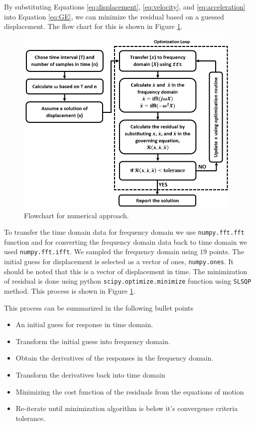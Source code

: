 \documentclass[12pt, a4paper]{extarticle}
\begin{document}
By substituting Equations \eqref{eq:displacement}, \eqref{eq:velocity}, and \eqref{eq:acceleration} into Equation \eqref{eq:GE}, we can minimize the residual based on a guessed displacement. The flow chart for this is shown in Figure \ref{fig:flowchart}.

\begin{figure}[h]
	\centering
	\includegraphics[height=9.00cm]{figure/minimize_residual.png}
	\caption{Flowchart for numerical approach.}
	\label{fig:flowchart}
\end{figure}

To transfer the time domain data for frequency domain we use \texttt{numpy.fft.fft} function and for converting the frequency domain data back to time domain we used \texttt{numpy.fft.ifft}. We sampled the frequency domain using $19$ points. The initial guess for displacement is selected as a vector of ones, \texttt{numpy.ones}. It should be noted that this is a vector of displacement in time. The minimization of residual is done using python \texttt{scipy.optimize.minimize} function using \texttt{SLSQP} method. This process is shown in Figure \ref{fig:flowchart}.

This process can be summarized in the following bullet points

\begin{itemize}
\item An initial guess for response in time domain.
\item Transform the initial guess into frequency domain. 
\item Obtain the derivatives of the responses in the frequency domain.
\item Transform the derivatives back into time domain
\item Minimizing the cost function of the residuals from the equations of motion 
\item Re-iterate until minimization algorithm is below it's convergence criteria tolerance.
\end{itemize}
\end{document}
